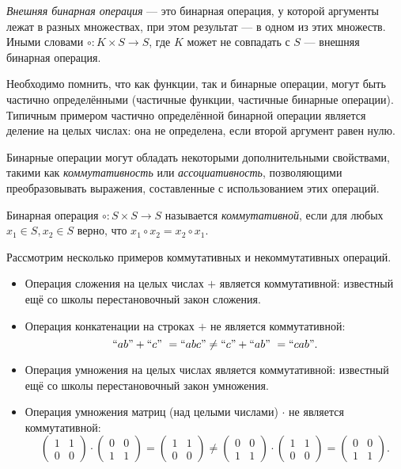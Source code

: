 \begin{definition}
\emph{Внешняя бинарная операция} --- это бинарная операция, у которой аргументы лежат в разных множествах, при этом результат --- в одном из этих множеств. Иными словами $\circ: K \times S \to S$, где $K$ может не совпадать с $S$  --- внешняя бинарная операция.
\end{definition}


Необходимо помнить, что как функции, так и бинарные операции, могут быть частично определёнными (частичные функции, частичные бинарные операции). Типичным примером частично определённой бинарной операции является деление на целых числах: она не определена, если второй аргумент равен нулю.


Бинарные операции могут обладать некоторыми дополнительными свойствами, такими как \textit{коммутативность} или \textit{ассоциативность}, позволяющими преобразовывать выражения, составленные с использованием этих операций.


\begin{definition}
Бинарная операция $\circ : S \times S \to S$ называется \emph{коммутативной}, если для любых  $x_1 \in S, x_2 \in S$ верно, что  $x_1 \circ x_2 = x_2 \circ x_1$.
\end{definition}

\begin{example} Рассмотрим несколько примеров коммутативных и некоммутативных операций.
	\begin{itemize}
		\item Операция сложения на целых числах $+$ является коммутативной: известный ещё со школы перестановочный закон сложения.
		\item Операция конкатенации на строках $+$ не является коммутативной: $$``ab" + ``c" \ = ``abc" \neq ``c" + ``ab" \ = ``cab".$$
		\item Операция умножения на целых числах является коммутативной: известный ещё со школы перестановочный закон умножения.
		\item Операция умножения матриц (над целыми числами) $\cdot$ не является коммутативной:
		$$\begin{pmatrix}
		1 & 1 \\ 0 & 0
		\end{pmatrix}
		\cdot
		\begin{pmatrix}
		0 & 0 \\ 1 & 1
		\end{pmatrix}
		=
		\begin{pmatrix}
		1 & 1 \\ 0 & 0
		\end{pmatrix}
		\neq
		\begin{pmatrix}
		0 & 0 \\ 1 & 1
		\end{pmatrix}
		\cdot
		\begin{pmatrix}
		1 & 1 \\ 0 & 0
		\end{pmatrix}
		=
		\begin{pmatrix}
		0 & 0 \\ 1 & 1
		\end{pmatrix}
		.$$
	\end{itemize}
\end{example}


